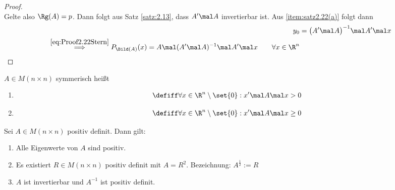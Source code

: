 \begin{proof}
	\\
	Gelte also $\Rg(A)=p$.
	Dann folgt aus Satz \ref{satz:2.13}, dass $A'\mal A$ invertierbar ist.
	Aus \ref{item:satz2.22(a)} folgt dann
	\begin{align*}
		y_0&=\big(A'\mal A\big)^{-1}\mal A'\mal x\\
		\overset{\eqref{eq:Proof2.22Stern}}{\implies}
		P_{\Bild(A)}(x)=A\mal(A'\mal A)^{-1}\mal A'\mal x\qquad\forall x\in\R^n
	\end{align*}
\end{proof}

\begin{definition}\label{def2.23}
	$A\in M(n\times n)$ symmerisch heißt
	\begin{enumerate}
		\item {}
		\begin{align*}
			\defiff\forall x\in\R^n\setminus\set{0}:x'\mal A\mal x>0
		\end{align*}
		\item {}
		\begin{align*}
			\defiff\forall x\in\R^n\setminus\set{0}:x'\mal A\mal x\geq0
		\end{align*}
	\end{enumerate}			
\end{definition}

\begin{satz}\label{satz2.24}
	Sei $A\in M(n\times n)$ positiv definit.
	Dann gilt:
	\begin{enumerate}[label=(\alph*)]
		\item Alle Eigenwerte von $A$ sind positiv.
		\label{item:satz2.24(a)}
		\item Es existiert $R\in M(n\times n)$ positiv definit mit $A=R^2$.
		Bezeichnung: $A^{\frac{1}{2}}:=R$
		\label{item:satz2.24(b)}
		\item $A$ ist invertierbar und $A^{-1}$ ist positiv definit.
		\label{item:satz2.24(c)}
	\end{enumerate}
\end{satz}

